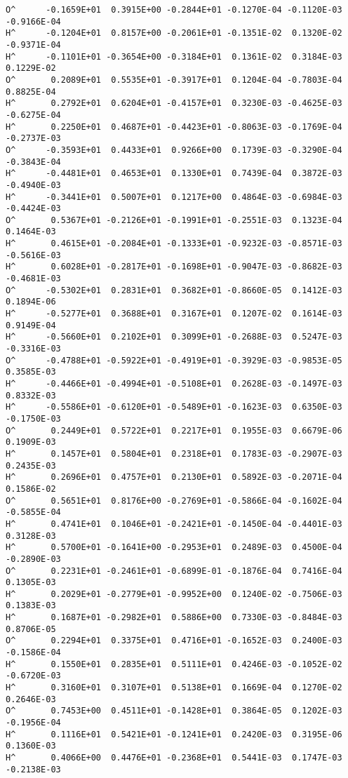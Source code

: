 \begin{verbatim}
O^      -0.1659E+01  0.3915E+00 -0.2844E+01 -0.1270E-04 -0.1120E-03 -0.9166E-04
H^      -0.1204E+01  0.8157E+00 -0.2061E+01 -0.1351E-02  0.1320E-02 -0.9371E-04
H^      -0.1101E+01 -0.3654E+00 -0.3184E+01  0.1361E-02  0.3184E-03  0.1229E-02
O^       0.2089E+01  0.5535E+01 -0.3917E+01  0.1204E-04 -0.7803E-04  0.8825E-04
H^       0.2792E+01  0.6204E+01 -0.4157E+01  0.3230E-03 -0.4625E-03 -0.6275E-04
H^       0.2250E+01  0.4687E+01 -0.4423E+01 -0.8063E-03 -0.1769E-04 -0.2737E-03
O^      -0.3593E+01  0.4433E+01  0.9266E+00  0.1739E-03 -0.3290E-04 -0.3843E-04
H^      -0.4481E+01  0.4653E+01  0.1330E+01  0.7439E-04  0.3872E-03 -0.4940E-03
H^      -0.3441E+01  0.5007E+01  0.1217E+00  0.4864E-03 -0.6984E-03 -0.4424E-03
O^       0.5367E+01 -0.2126E+01 -0.1991E+01 -0.2551E-03  0.1323E-04  0.1464E-03
H^       0.4615E+01 -0.2084E+01 -0.1333E+01 -0.9232E-03 -0.8571E-03 -0.5616E-03
H^       0.6028E+01 -0.2817E+01 -0.1698E+01 -0.9047E-03 -0.8682E-03 -0.4681E-03
O^      -0.5302E+01  0.2831E+01  0.3682E+01 -0.8660E-05  0.1412E-03  0.1894E-06
H^      -0.5277E+01  0.3688E+01  0.3167E+01  0.1207E-02  0.1614E-03  0.9149E-04
H^      -0.5660E+01  0.2102E+01  0.3099E+01 -0.2688E-03  0.5247E-03 -0.3316E-03
O^      -0.4788E+01 -0.5922E+01 -0.4919E+01 -0.3929E-03 -0.9853E-05  0.3585E-03
H^      -0.4466E+01 -0.4994E+01 -0.5108E+01  0.2628E-03 -0.1497E-03  0.8332E-03
H^      -0.5586E+01 -0.6120E+01 -0.5489E+01 -0.1623E-03  0.6350E-03 -0.1750E-03
O^       0.2449E+01  0.5722E+01  0.2217E+01  0.1955E-03  0.6679E-06  0.1909E-03
H^       0.1457E+01  0.5804E+01  0.2318E+01  0.1783E-03 -0.2907E-03  0.2435E-03
H^       0.2696E+01  0.4757E+01  0.2130E+01  0.5892E-03 -0.2071E-04  0.1586E-02
O^       0.5651E+01  0.8176E+00 -0.2769E+01 -0.5866E-04 -0.1602E-04 -0.5855E-04
H^       0.4741E+01  0.1046E+01 -0.2421E+01 -0.1450E-04 -0.4401E-03  0.3128E-03
H^       0.5700E+01 -0.1641E+00 -0.2953E+01  0.2489E-03  0.4500E-04 -0.2890E-03
O^       0.2231E+01 -0.2461E+01 -0.6899E-01 -0.1876E-04  0.7416E-04  0.1305E-03
H^       0.2029E+01 -0.2779E+01 -0.9952E+00  0.1240E-02 -0.7506E-03  0.1383E-03
H^       0.1687E+01 -0.2982E+01  0.5886E+00  0.7330E-03 -0.8484E-03  0.8706E-05
O^       0.2294E+01  0.3375E+01  0.4716E+01 -0.1652E-03  0.2400E-03 -0.1586E-04
H^       0.1550E+01  0.2835E+01  0.5111E+01  0.4246E-03 -0.1052E-02 -0.6720E-03
H^       0.3160E+01  0.3107E+01  0.5138E+01  0.1669E-04  0.1270E-02  0.2646E-03
O^       0.7453E+00  0.4511E+01 -0.1428E+01  0.3864E-05  0.1202E-03 -0.1956E-04
H^       0.1116E+01  0.5421E+01 -0.1241E+01  0.2420E-03  0.3195E-06  0.1360E-03
H^       0.4066E+00  0.4476E+01 -0.2368E+01  0.5441E-03  0.1747E-03 -0.2138E-03

\end{verbatim}
